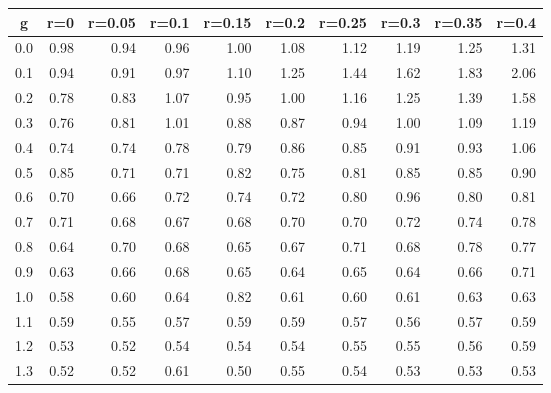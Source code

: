 %
\begin{table}[!tbp]
 \begin{center}
 \begin{tabular}{rrrrrrrrrr}\hline\hline
\multicolumn{1}{c}{g}&\multicolumn{1}{c}{r=0}&\multicolumn{1}{c}{r=0.05}&\multicolumn{1}{c}{r=0.1}&\multicolumn{1}{c}{r=0.15}&\multicolumn{1}{c}{r=0.2}&\multicolumn{1}{c}{r=0.25}&\multicolumn{1}{c}{r=0.3}&\multicolumn{1}{c}{r=0.35}&\multicolumn{1}{c}{r=0.4}\tabularnewline
\hline
0.0&0.98&0.94&0.96&1.00&1.08&1.12&1.19&1.25&1.31\tabularnewline
0.1&0.94&0.91&0.97&1.10&1.25&1.44&1.62&1.83&2.06\tabularnewline
0.2&0.78&0.83&1.07&0.95&1.00&1.16&1.25&1.39&1.58\tabularnewline
0.3&0.76&0.81&1.01&0.88&0.87&0.94&1.00&1.09&1.19\tabularnewline
0.4&0.74&0.74&0.78&0.79&0.86&0.85&0.91&0.93&1.06\tabularnewline
0.5&0.85&0.71&0.71&0.82&0.75&0.81&0.85&0.85&0.90\tabularnewline
0.6&0.70&0.66&0.72&0.74&0.72&0.80&0.96&0.80&0.81\tabularnewline
0.7&0.71&0.68&0.67&0.68&0.70&0.70&0.72&0.74&0.78\tabularnewline
0.8&0.64&0.70&0.68&0.65&0.67&0.71&0.68&0.78&0.77\tabularnewline
0.9&0.63&0.66&0.68&0.65&0.64&0.65&0.64&0.66&0.71\tabularnewline
1.0&0.58&0.60&0.64&0.82&0.61&0.60&0.61&0.63&0.63\tabularnewline
1.1&0.59&0.55&0.57&0.59&0.59&0.57&0.56&0.57&0.59\tabularnewline
1.2&0.53&0.52&0.54&0.54&0.54&0.55&0.55&0.56&0.59\tabularnewline
1.3&0.52&0.52&0.61&0.50&0.55&0.54&0.53&0.53&0.53\tabularnewline
\hline
\end{tabular}

\end{center}

\end{table}

